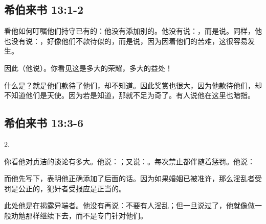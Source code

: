 
\subsection{希伯来书 13:1-2}

看他如何叮嘱他们持守已有的：他没有添加别的。他没有说：，而是说。同样，他也没有说：，好像他们不款待似的，而是说，因为因着他们的苦难，这很容易发生。\par

因此（他说）。你看见这是多大的荣耀，多大的益处！\par

什么是？就是他们款待了他们，却不知道。因此奖赏也很大，因为他款待他们，却不知道他们是天使。因为若是知道，那就不足为奇了。有人说他在这里也暗指。\par


\subsection{希伯来书 13:3-6}

2. \par

你看他对贞洁的谈论有多大。他说：；又说：。每次禁止都伴随着惩罚。他说：\par

而他先写下，表明他正确添加了后面的话。因为如果婚姻已被准许，那么淫乱者受罚是公正的，犯奸者受报应是正当的。\par

此处他是在揭露异端者。他没有再说：不要有人淫乱；但一旦说过了，他就像做一般劝勉那样继续下去，而不是专门针对他们。\par

